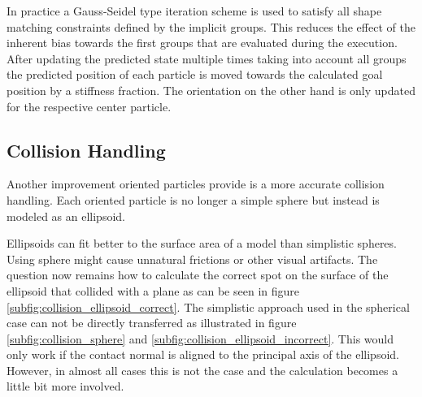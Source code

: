 In practice a Gauss-Seidel type iteration scheme is used to satisfy all shape matching constraints defined by the implicit groups. This reduces the effect of the inherent bias towards the first groups that are evaluated during the execution. After updating the predicted state multiple times taking into account all groups the predicted position of each particle is moved towards the calculated goal position by a stiffness fraction. The orientation on the other hand is only updated for the respective center particle.

\subsection{Collision Handling}
\label{subsec:collision_handling}

Another improvement oriented particles provide is a more accurate collision handling. Each oriented particle is no longer a simple sphere but instead is modeled as an ellipsoid.

\begin{figure}[htb]
  \centering
  \label{fig:collision_handling}
\end{figure}

Ellipsoids can fit better to the surface area of a model than simplistic spheres. Using sphere might cause unnatural frictions or other visual artifacts. The question now remains how to calculate the correct spot on the surface of the ellipsoid that collided with a plane as can be seen in figure \ref{subfig:collision_ellipsoid_correct}. The simplistic approach used in the spherical case can not be directly transferred as illustrated in figure \ref{subfig:collision_sphere} and \ref{subfig:collision_ellipsoid_incorrect}. This would only work if the contact normal is aligned to the principal axis of the ellipsoid. However, in almost all cases this is not the case and the calculation becomes a little bit more involved.

